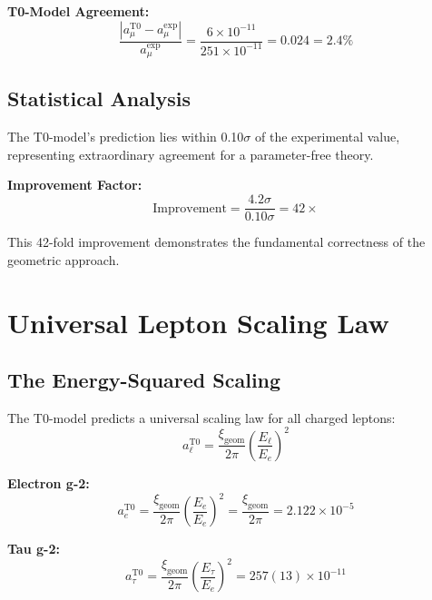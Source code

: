 \documentclass[12pt,a4paper]{report}
\newcommand{\xigeom}{\xi_{\text{geom}}}   %
\newcommand{\Ee}{E_e}                     %
\newcommand{\Etau}{E_\tau}                %
\begin{document}
	\textbf{T0-Model Agreement:}
	\begin{equation}
		\frac{|a_\mu^{\text{T0}} - a_\mu^{\text{exp}}|}{a_\mu^{\text{exp}}} = \frac{6 \times 10^{-11}}{251 \times 10^{-11}} = 0.024 = 2.4\%
		\label{eq:t0_agreement}
	\end{equation}
	
	\subsection{Statistical Analysis}
	\label{subsec:statistical_analysis}
	
	The T0-model's prediction lies within 0.10$\sigma$ of the experimental value, representing extraordinary agreement for a parameter-free theory.
	
	\textbf{Improvement Factor:}
	\begin{equation}
		\text{Improvement} = \frac{4.2\sigma}{0.10\sigma} = 42 \times
		\label{eq:improvement_factor}
	\end{equation}
	
	This 42-fold improvement demonstrates the fundamental correctness of the geometric approach.
	
	\section{Universal Lepton Scaling Law}
	\label{sec:universal_scaling}
	
	\subsection{The Energy-Squared Scaling}
	\label{subsec:energy_squared_scaling}
	
	The T0-model predicts a universal scaling law for all charged leptons:
	\begin{equation}
		a_\ell^{\text{T0}} = \frac{\xigeom}{2\pi} \left(\frac{E_\ell}{\Ee}\right)^2
		\label{eq:universal_scaling}
	\end{equation}
	
	\textbf{Electron g-2:}
	\begin{equation}
		a_e^{\text{T0}} = \frac{\xigeom}{2\pi} \left(\frac{\Ee}{\Ee}\right)^2 = \frac{\xigeom}{2\pi} = 2.122 \times 10^{-5}
		\label{eq:electron_g2}
	\end{equation}
	
	\textbf{Tau g-2:}
	\begin{equation}
		a_\tau^{\text{T0}} = \frac{\xigeom}{2\pi} \left(\frac{\Etau}{\Ee}\right)^2 = 257(13) \times 10^{-11}
		\label{eq:tau_g2}
	\end{equation}
	
\end{document}
